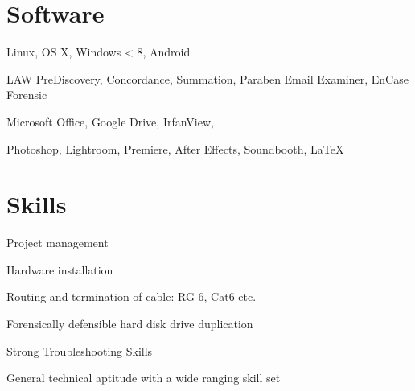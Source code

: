 \documentclass[line,margin]{res}
\begin{document}
\begin{resume}
\section{Software}
 \begin{description} \itemsep -2pt
 \item[Operating Systems:] Linux, OS X, Windows < 8, Android
 \item[EDD Specfic:] LAW PreDiscovery, Concordance, Summation, Paraben Email Examiner, EnCase Forensic
 \item[General:] Microsoft Office, Google Drive, IrfanView, 
 \item[Design:] Photoshop, Lightroom, Premiere, After Effects, Soundbooth, \LaTeX
 \end{description}
\section{Skills}
 \begin{description} \itemsep -2pt
 \item Project management
 \item Hardware installation
 \item Routing and termination of cable: RG-6, Cat6 etc.  
 \item Forensically defensible hard disk drive duplication
 \item Strong Troubleshooting Skills
 \item General technical aptitude with a wide ranging skill set
 \end{description}
					

\end{resume}
\end{document}
